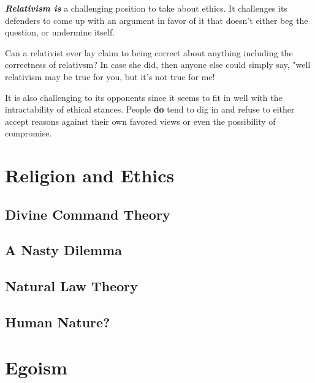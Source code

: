 \documentclass[]{book}
\makeatletter
\newenvironment{kframe}{%
\medskip{}
\setlength{\fboxsep}{.8em}
 \def\at@end@of@kframe{}%
 \ifinner\ifhmode%
  \def\at@end@of@kframe{\end{minipage}}%
  \begin{minipage}{\columnwidth}%
 \fi\fi%
 \def\FrameCommand##1{\hskip\@totalleftmargin \hskip-\fboxsep
 \colorbox{shadecolor}{##1}\hskip-\fboxsep
     \hskip-\linewidth \hskip-\@totalleftmargin \hskip\columnwidth}%
 \MakeFramed {\advance\hsize-\width
   \@totalleftmargin\z@ \linewidth\hsize
   \@setminipage}}%
 {\par\unskip\endMakeFramed%
 \at@end@of@kframe}
\newenvironment{rmdblock}[1]
  {
  \begin{itemize}
  \renewcommand{\labelitemi}{
    \raisebox{-.7\height}[0pt][0pt]{
      {\setkeys{Gin}{width=3em,keepaspectratio}\texttt{[image: img/\#1]}}
    }
  }
  \setlength{\fboxsep}{1em}
  \begin{kframe}
  \item
  }
  {
  \end{kframe}
  \end{itemize}
  }
\newenvironment{rmdwarning}
  {\begin{rmdblock}{warning}}
  {\end{rmdblock}}
\makeatother
\begin{document}
\textbf{\emph{Relativism is}} a challenging position to take about ethics. It challenges its defenders to come up with an argument in favor of it that doesn't either beg the question, or undermine itself.

\begin{rmdwarning}
Can a relativist ever lay claim to being correct about anything
including the correctness of relativsm? In case she did, then anyone
else could simply say, "well relativism may be true for you, but it's
not true for me!
\end{rmdwarning}

It is also challenging to its opponents since it seems to fit in well with the intractability of ethical stances. People \textbf{do} tend to dig in and refuse to either accept reasons against their own favored views or even the possibility of compromise.

\hypertarget{religion-and-ethics}{%
\chapter{Religion and Ethics}\label{religion-and-ethics}}

\hypertarget{divine-command-theory}{%
\section{Divine Command Theory}\label{divine-command-theory}}

\hypertarget{a-nasty-dilemma}{%
\section{A Nasty Dilemma}\label{a-nasty-dilemma}}

\hypertarget{natural-law-theory}{%
\section{Natural Law Theory}\label{natural-law-theory}}

\hypertarget{human-nature}{%
\section{Human Nature?}\label{human-nature}}

\hypertarget{egoism}{%
\chapter{Egoism}\label{egoism}}
\end{document}
